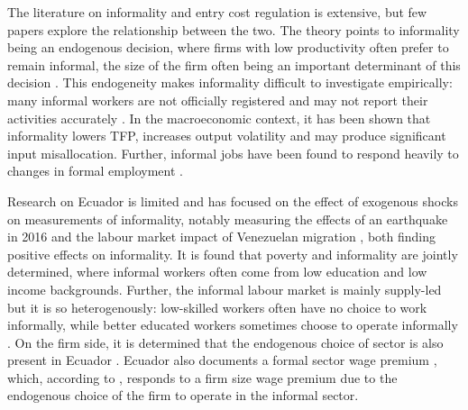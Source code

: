 \documentclass[11pt,a4paper]{article}\usepackage[]{graphicx}\usepackage[]{xcolor}
\begin{document}
The literature on informality and entry cost regulation is extensive, but few papers explore the relationship between the two. The theory points to informality being an endogenous decision, where firms with low productivity often prefer to remain informal, the size of the firm often being an important determinant of this decision \parencite{Delechat2020, MauricioPrado.2011, ElianeElBadaoui.2010}. This endogeneity makes informality difficult to investigate empirically: many informal workers are not officially registered and may not report their activities accurately \textcite{Oviedo.2009}. In the macroeconomic context, it has been shown that informality lowers TFP, increases output volatility and may produce significant input misallocation. Further, informal jobs have been found to respond heavily to changes in formal employment \parencite{Leyva.2020}.

Research on Ecuador is limited and has focused on the effect of exogenous shocks on measurements of informality, notably measuring the effects of an earthquake in 2016 \parencite{Mendoza.2020} and the labour market impact of Venezuelan migration \parencite{Olivieri.2022}, both finding positive effects on informality. It is found that poverty and informality are jointly determined, where informal workers often come from low education and low income backgrounds. Further, the informal labour market is mainly supply-led but it is so heterogenously: low-skilled workers often have no choice to work informally, while better educated workers sometimes choose to operate informally \parencite{Canelas.2019}. On the firm side, it is determined that the endogenous choice of sector is also present in Ecuador \parencite{Medvedev.2016}. Ecuador also documents a formal sector wage premium \textcite{MacIsaac.1997}, which, according to \textcite{ElianeElBadaoui.2010}, responds to a firm size wage premium due to the endogenous choice of the firm to operate in the informal sector. 
\end{document}

